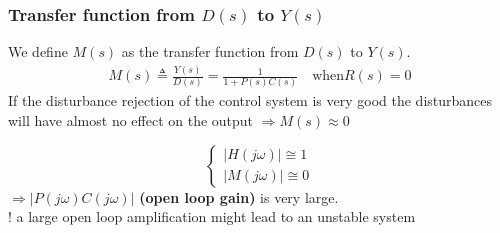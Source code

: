 \begin{frame}
	\frametitle{Transfer function from $D(s)$ to $Y(s)$}
	\begin{definition}
		We define $M(s)$ as the transfer function from $D(s)$ to $Y(s)$.
		\begin{align*}
		M(s) \triangleq \frac{Y(s)}{D(s)} = \frac{1}{1 + P(s)C(s)} \quad \text{when} R(s) = 0
		\end{align*}
		If the disturbance rejection of the control system is very good the disturbances will have almost no effect on the output $\Rightarrow M(s) \approx 0$ \\
	\end{definition}
	\begin{block}{}
		\[
		\begin{cases}
			\left| H(j\omega) \right| \cong 1 \\
			\left| M(j\omega) \right| \cong 0
		\end{cases}
		\]
		$\Rightarrow  \left| P(j\omega)C(j\omega) \right|$ \textbf{(open loop gain)} is very large. \\
		
		! a large open loop amplification might lead to an unstable system
	\end{block}
\end{frame}

